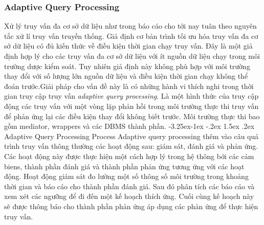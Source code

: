 \documentclass[a4paper]{article}
\makeatletter
\newcounter {subsubsubsection}[subsubsection]
\newcommand\subsubsubsection{\@startsection{subsubsubsection}{4}{\z@}%
                                     {-3.25ex\@plus -1ex \@minus -.2ex}%
                                     {1.5ex \@plus .2ex}%
                                     {\normalfont\normalsize\bfseries}}
\makeatother
\begin{document}
\subsubsection{Adaptive Query Processing}
Xử lý truy vấn đa cơ sở dữ liệu như trong báo cáo cho tới nay tuân theo nguyên tắc xử lí truy vấn truyền thống. Giả định cơ bản trình tối ưu hóa truy vấn đa cơ sở dữ liệu có đủ kiến thức về điều kiện thời gian chạy truy vấn. Đây là một giả định hợp lý cho các truy vấn đa cơ sở dữ liệu với ít nguồn dữ liệu chạy trong môi trường dược kiểm soát. Tuy nhiên giả định này không phù hợp với môi trường thay đổi với số lượng lớn nguồn dữ liệu và điều kiện thời gian chạy không thể đoán trước.Giải pháp cho vấn đề này là có những hành vi thích nghi trong thời gian truy cập truy vấn \textit{adaptive query processing}. Là một hình thức của truy cập động các truy vấn với một vòng lặp phản hồi trong môi trường thực thi truy vấn để phản ứng lại các điều kiện thay đổi không biết trước. Môi trường thực thi bao gồm mediator, wrappers và các DBMS thành phần.
\subsubsubsection{Adaptive Query Processing Process}
Adaptive query processing thêm vào câu quá trình truy vấn thông thường các hoạt động sau: giám sát, đánh giá và phản ứng. Các hoạt động này được thực hiện một cách hợp lý trong hệ thông bởi các cảm biens, thành phần đánh giá và thành phần phản ứng tương ứng với các hoạt động. Hoạt động giám sát đo lường một số thông số môi trường trong khoảng thời gian và báo cáo cho thành phần đánh giá. Sau đó phân tích các báo cáo và xem xét các ngưỡng để đi đến một kế hoạch thích ứng. Cuối cùng kế hoạch này sẽ được thông báo cho thành phần phản ứng áp dụng các phản ứng để thực hiện truy vấn.\\
\end{document}
